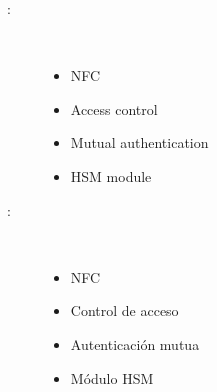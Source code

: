 \begin{multicols}{2}
	\begin{description}
	\item [\palabraschavesecundaria:] \mbox{} \\[-20pt]
		\begin{itemize}
				\item NFC
				\item Access control
				\item Mutual authentication
				\item HSM module
		\end{itemize}
	\end{description}
	
	\begin{description}
	\item [\palabraschaveprincipal:] \mbox{} \\[-20pt]
		\begin{itemize}
			\item NFC
			\item Control de acceso
			\item Autenticación mutua
			\item Módulo HSM
		
		\end{itemize}
	\end{description}
\end{multicols}

